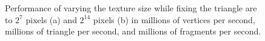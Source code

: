 \begin{figure}[!tbh]
 \centering   
  \caption{Performance of varying the texture size while fixing the triangle are to $2^{7}$ pixels (a) and $2^{14}$ pixels (b) in millions of vertices per second, millions of triangle per second, and millions of fragments per second. }
   \label{fig:fill_geo4}
\end{figure} 
